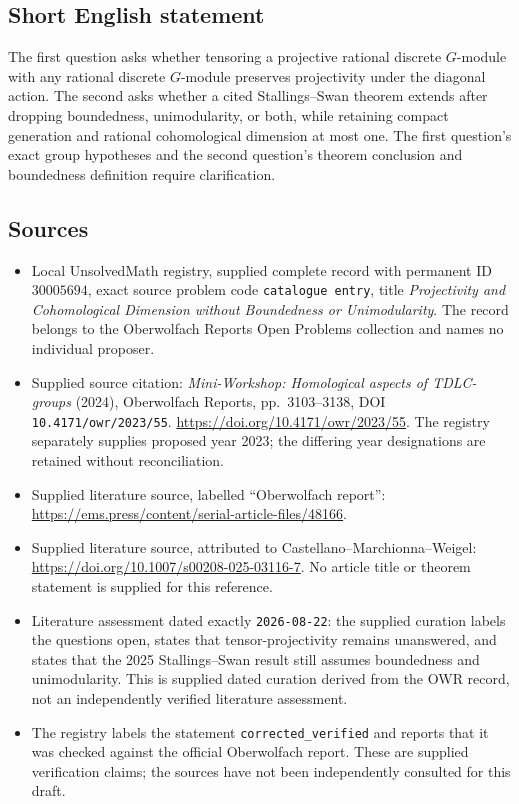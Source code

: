 \documentclass[11pt]{article}
\begin{document}
\subsection{Short English statement}
The first question asks whether tensoring a projective rational discrete \(G\)-module with any rational discrete \(G\)-module preserves projectivity under the diagonal action. The second asks whether a cited Stallings--Swan theorem extends after dropping boundedness, unimodularity, or both, while retaining compact generation and rational cohomological dimension at most one. The first question's exact group hypotheses and the second question's theorem conclusion and boundedness definition require clarification.
\subsection{Sources}
\begin{itemize}
\item Local UnsolvedMath registry, supplied complete record with permanent ID \(30005694\), exact source problem code \texttt{catalogue entry}, title \emph{Projectivity and Cohomological Dimension without Boundedness or Unimodularity}. The record belongs to the Oberwolfach Reports Open Problems collection and names no individual proposer.
\item Supplied source citation: \emph{Mini-Workshop: Homological aspects of TDLC-groups} (2024), Oberwolfach Reports, pp.\ 3103--3138, DOI \texttt{10.4171/owr/2023/55}. \url{https://doi.org/10.4171/owr/2023/55}. The registry separately supplies proposed year 2023; the differing year designations are retained without reconciliation.
\item Supplied literature source, labelled ``Oberwolfach report'': \url{https://ems.press/content/serial-article-files/48166}.
\item Supplied literature source, attributed to Castellano--Marchionna--Weigel: \url{https://doi.org/10.1007/s00208-025-03116-7}. No article title or theorem statement is supplied for this reference.
\item Literature assessment dated exactly \texttt{2026-08-22}: the supplied curation labels the questions open, states that tensor-projectivity remains unanswered, and states that the 2025 Stallings--Swan result still assumes boundedness and unimodularity. This is supplied dated curation derived from the OWR record, not an independently verified literature assessment.
\item The registry labels the statement \texttt{corrected\_verified} and reports that it was checked against the official Oberwolfach report. These are supplied verification claims; the sources have not been independently consulted for this draft.
\end{itemize}
\end{document}
